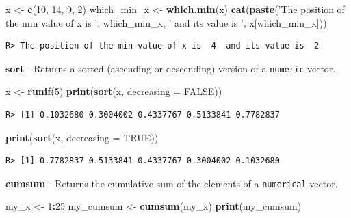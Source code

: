 \documentclass[
  12pt,
]{book}
\newenvironment{Shaded}{\begin{snugshade}}{\end{snugshade}}
\newcommand{\DataTypeTok}[1]{\textcolor[rgb]{0.27,0.27,0.27}{#1}}
\newcommand{\DecValTok}[1]{\textcolor[rgb]{0.06,0.06,0.06}{#1}}
\newcommand{\KeywordTok}[1]{\textcolor[rgb]{0.27,0.27,0.27}{\textbf{#1}}}
\newcommand{\NormalTok}[1]{#1}
\newcommand{\OperatorTok}[1]{\textcolor[rgb]{0.43,0.43,0.43}{\textbf{#1}}}
\newcommand{\OtherTok}[1]{\textcolor[rgb]{0.37,0.37,0.37}{#1}}
\newcommand{\StringTok}[1]{\textcolor[rgb]{0.5,0.5,0.5}{#1}}
\begin{document}
\begin{Shaded}
\begin{Highlighting}[]
\NormalTok{x <-}\StringTok{ }\KeywordTok{c}\NormalTok{(}\DecValTok{10}\NormalTok{, }\DecValTok{14}\NormalTok{, }\DecValTok{9}\NormalTok{, }\DecValTok{2}\NormalTok{)}
\NormalTok{which_min_x <-}\StringTok{ }\KeywordTok{which.min}\NormalTok{(x)}
\KeywordTok{cat}\NormalTok{(}\KeywordTok{paste}\NormalTok{(}\StringTok{'The position of the min value of x is '}\NormalTok{,}
\NormalTok{          which_min_x, }\StringTok{' and its value is '}\NormalTok{, x[which_min_x]))}
\end{Highlighting}
\end{Shaded}

\begin{verbatim}
R> The position of the min value of x is  4  and its value is  2
\end{verbatim}

\textbf{sort} - Returns a sorted (ascending or descending) version of a \texttt{numeric} vector. 

\begin{Shaded}
\begin{Highlighting}[]
\NormalTok{x <-}\StringTok{ }\KeywordTok{runif}\NormalTok{(}\DecValTok{5}\NormalTok{)}
\KeywordTok{print}\NormalTok{(}\KeywordTok{sort}\NormalTok{(x, }\DataTypeTok{decreasing =} \OtherTok{FALSE}\NormalTok{))}
\end{Highlighting}
\end{Shaded}

\begin{verbatim}
R> [1] 0.1032680 0.3004002 0.4337767 0.5133841 0.7782837
\end{verbatim}

\begin{Shaded}
\begin{Highlighting}[]
\KeywordTok{print}\NormalTok{(}\KeywordTok{sort}\NormalTok{(x, }\DataTypeTok{decreasing =} \OtherTok{TRUE}\NormalTok{))}
\end{Highlighting}
\end{Shaded}

\begin{verbatim}
R> [1] 0.7782837 0.5133841 0.4337767 0.3004002 0.1032680
\end{verbatim}

\textbf{cumsum} - Returns the cumulative sum of the elements of a \texttt{numerical} vector. 

\begin{Shaded}
\begin{Highlighting}[]
\NormalTok{my_x <-}\StringTok{ }\DecValTok{1}\OperatorTok{:}\DecValTok{25}
\NormalTok{my_cumsum <-}\StringTok{ }\KeywordTok{cumsum}\NormalTok{(my_x)}
\KeywordTok{print}\NormalTok{(my_cumsum)}
\end{Highlighting}
\end{Shaded}
\end{document}
